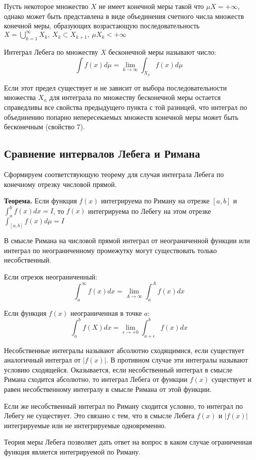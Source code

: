 \documentclass[14pt,a4paper]{extarticle}
\theoremstyle{definition}
\theoremstyle{remark}
\newcommand{\sep}{ , \ \allowbreak }
\renewcommand{\[}{\begin{dmath*}[compact]}
\renewcommand{\]}{\end{dmath*}}
\newcommand{\tth}[1][]{\textbf{Теорема#1.}}
\begin{document}
Пусть некоторое множество $X$ не имеет конечной меры такой что $\mu X = + \infty$, однако может быть представлена в виде объединения счетного числа множеств конечной меры, образующих возрастающую последовательность $X= \bigcup_{k=1}^\infty X_k \sep X_k \subset X_{k+1} \sep \mu X_k <+ \infty$

Интеграл Лебега по множеству $X$ бесконечной меры называют число:
\[\int f(x) d\mu = \lim_{k \to \infty} \int_{X_k}f(x) d \mu\]

Если этот предел существует и не зависит от выбора последовательности множества $X_n$ для интеграла по множеству бесконечной меры остается справедливы все свойства предыдущего пункта с той разницей, что интеграл по объединению попарно непересекаемых множеств конечной меры может быть бесконечным (свойство 7).

\subsection{Сравнение интервалов Лебега и Римана}

Сформируем соответствующую теорему для случая интеграла Лебега по конечному отрезку числовой прямой.

\tth[] Если функция $f(x)$ интегрируема по Риману на отрезке $[a,b]$ и $\int_a^b f(x) dx = I$, то $f(x)$ интегрируема по Лебегу на этом отрезке $\int_{[a,b]} f(x) d \mu = I$

В смысле Римана на числовой прямой интеграл от неограниченной функции или интеграл по неограниченному промежутку могут существовать только несобственный.

Если отрезок неограниченный:
\[\int_a^\infty f(x)dx = \lim_{A \to \infty} \int_a^A f(x) dx\]

Если функция $f(x)$ неограниченная в точке $a$:
\[\int_a^b f(X)dx = \lim_{\epsilon \to +0} \int_{a+\epsilon}^b f(x) dx\]

Несобственные интегралы называют абсолютно сходящимися, если существует аналогичный интеграл от $|f(x)|$. В противном случае эти интегралы называют условию сходящейся. Оказывается, если несобственный интеграл в смысле Римана сходится абсолютно, то интеграл Лебега от функции $f(x)$ существует и равен несобственному интегралу в смысле Римана от этой функции.

Если же несобственный интеграл по Риману сходится условно, то интеграл по Лебегу не существует. Это связано с тем, что в смысле Лебега $f(x)$ и $|f(x)|$ интегрируемые или не интегрируемые одновременно.

Теория меры Лебега позволяет дать ответ на вопрос в каком случае ограниченная функция является интегрируемой по Риману.
\end{document}
